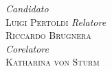 \documentclass[12pt, a4paper]{book}
\begin{document}
\begin{titlepage}
	\vspace{3cm}
	\begin{multicols}{2}
	\noindent
	\textsl{Candidato} \\
	\textsc{Luigi Pertoldi}
	\columnbreak
	\flushright
	\textsl{Relatore} \\
	\textsc{Riccardo Brugnera} \\
	\vspace{5mm}
	\textsl{Corelatore} \\
	\textsc{Katharina von Sturm}
	\end{multicols}
\end{titlepage}
\tableofcontents




\end{document}
